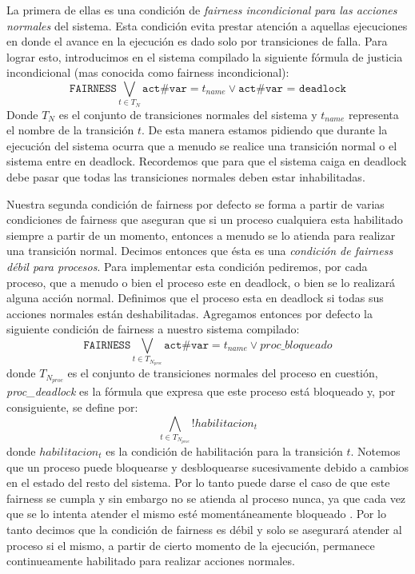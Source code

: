 \documentclass[pdftex,a4paper,12pt]{book}
\begin{document}
La primera de ellas es una condici\'on de \textit{fairness incondicional para las acciones normales} del sistema. Esta condici\'on evita prestar atenci\'on a aquellas ejecuciones en donde el avance en la ejecuci\'on es dado solo por transiciones de falla. Para lograr esto, introducimos en el sistema compilado la siguiente f\'ormula de justicia incondicional (mas conocida como fairness incondicional):
$$\texttt{FAIRNESS} \bigvee_{t \in T_N} \texttt{act\#var} = t_{name} \vee \texttt{act\#var = deadlock}$$
Donde $T_N$ es el conjunto de transiciones normales del sistema y $t_{name}$ representa el nombre de la transici\'on $t$. De esta manera estamos pidiendo que durante la ejecuci\'on del sistema ocurra que a menudo se realice una transici\'on normal o el sistema entre en deadlock. Recordemos que para que el sistema caiga en deadlock debe pasar que todas las transiciones normales deben estar inhabilitadas.

Nuestra segunda condici\'on de fairness por defecto se forma a partir de varias condiciones de fairness que aseguran que si un proceso cualquiera esta habilitado siempre a partir de un momento, entonces a menudo se lo atienda para realizar una transici\'on normal. Decimos entonces que \'esta es una \textit{condici\'on de fairness d\'ebil para procesos}. Para implementar esta condici\'on pediremos, por cada proceso, que a menudo o bien el proceso este en deadlock, o bien se lo realizar\'a alguna acci\'on normal. Definimos que el proceso esta en deadlock si todas sus acciones normales est\'an deshabilitadas. Agregamos entonces por defecto la siguiente condici\'on de fairness a nuestro sistema compilado:
$$\texttt{FAIRNESS} \bigvee_{t \in T_{N_{proc}}} \texttt{act\#var} = t_{name} \vee proc\_bloqueado$$
donde $T_{N_{proc}}$ es el conjunto de transiciones normales del proceso en cuesti\'on, \textit{proc\_deadlock} es la f\'ormula que expresa que este proceso est\'a bloqueado y, por consiguiente, se define por:
$$\bigwedge_{t \in T_{N_{proc}}}! habilitacion_{t}$$
donde $habilitacion_{t}$ es la condici\'on de habilitaci\'on para la transici\'on $t$. Notemos que un proceso puede bloquearse y desbloquearse sucesivamente debido a cambios en el estado del resto del sistema. Por lo tanto puede darse el caso de que este fairness se cumpla y sin embargo no se atienda al proceso nunca, ya que cada vez que se lo intenta atender el mismo est\'e moment\'aneamente bloqueado . Por lo tanto decimos que la condici\'on de fairness es d\'ebil y solo se asegurar\'a atender al proceso si el mismo, a partir de cierto momento de la ejecuci\'on, permanece continueamente habilitado para realizar acciones normales.
\end{document}
